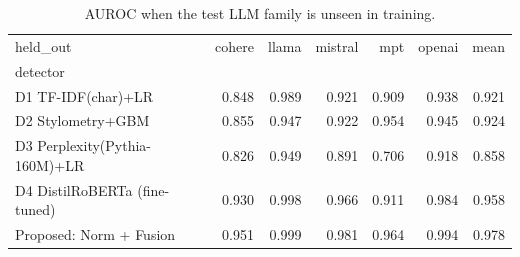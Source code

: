 \begin{table}
\caption{AUROC when the test LLM family is unseen in training.}
\label{tab:table3_logo}
\begin{tabular}{lrrrrrr}
\toprule
held_out & cohere & llama & mistral & mpt & openai & mean \\
detector &  &  &  &  &  &  \\
\midrule
D1 TF-IDF(char)+LR & 0.848 & 0.989 & 0.921 & 0.909 & 0.938 & 0.921 \\
D2 Stylometry+GBM & 0.855 & 0.947 & 0.922 & 0.954 & 0.945 & 0.924 \\
D3 Perplexity(Pythia-160M)+LR & 0.826 & 0.949 & 0.891 & 0.706 & 0.918 & 0.858 \\
D4 DistilRoBERTa (fine-tuned) & 0.930 & 0.998 & 0.966 & 0.911 & 0.984 & 0.958 \\
Proposed: Norm + Fusion & 0.951 & 0.999 & 0.981 & 0.964 & 0.994 & 0.978 \\
\bottomrule
\end{tabular}
\end{table}
